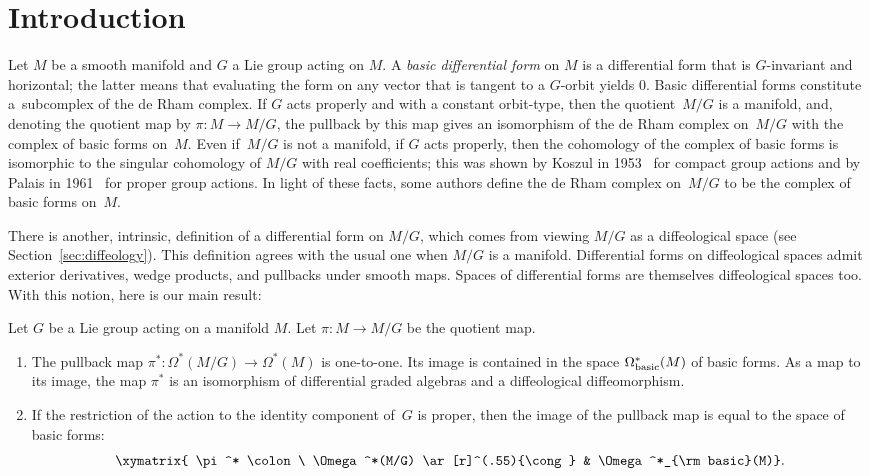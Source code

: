 \section{Introduction}\label{sec:intro}

Let $M$ be a smooth manifold and $G$ a Lie group acting on $M$.
A \emph{basic differential form} on $M$
is a dif\/ferential form that is $G$-invariant and horizontal;
the latter means that
evaluating the form on any vector that is tangent to a $G$-orbit yields $0$.
Basic dif\/ferential forms constitute a~subcomplex of the de Rham complex.
If $G$ acts properly and with a constant orbit-type, then the quotient~$M/G$ is a manifold,
and, denoting the quotient map by $\pi \colon M \to M/G$,
the pullback by this map
gives an isomorphism of the de Rham complex on~$M/G$
with the complex of basic forms on~$M$.
Even if~$M/G$ is not a manifold, if $G$ acts properly, then
the cohomology of the complex of basic forms
is isomorphic to the singular cohomology of $M/G$ with real coef\/f\/icients;
this was shown by Koszul in 1953~\cite{koszul} for compact group actions
and by Palais in 1961~\cite{palais} for proper group actions.
In light of these facts, some authors def\/ine the de Rham complex on~$M/G$
to be the complex of basic forms on~$M$.

There is another, intrinsic, def\/inition of a dif\/ferential form on $M/G$,
which comes from viewing $M/G$ as a dif\/feological space (see Section~\ref{sec:diffeology}). This def\/inition agrees with the usual one when $M/G$ is a manifold. Dif\/ferential forms on dif\/feological spaces
admit exterior derivatives,
wedge products, and pullbacks under smooth maps.
Spaces of dif\/ferential forms are themselves dif\/feological spaces too.
With this notion, here is our main result:

\begin{Theorem}\label{t:main}
Let $G$ be a Lie group acting on a manifold $M$.
Let $\pi\colon M\to M/G$ be the quotient map.
\begin{enumerate}\itemsep=0pt
\item[$(i)$] The pullback map $\pi^* \colon \Omega^*(M/G) \to \Omega^*(M)$
is one-to-one. Its image is contained in the space $\Omega^*_{\rm basic}(M)$
of basic forms. As a map to its image,
the map $\pi^*$ is an isomorphism of differential graded algebras
and a diffeological diffeomorphism.
\item[$(ii)$] If the restriction of the action to the identity component of~$G$
is proper, then the image of the pullback map is equal to the space
of basic forms:
\begin{gather*}\xymatrix{
\pi^* \colon \ \Omega^*(M/G) \ar[r]^(.55){\cong}
& \Omega^*_{\rm basic}(M)}.\end{gather*}
\end{enumerate}
\end{Theorem}
